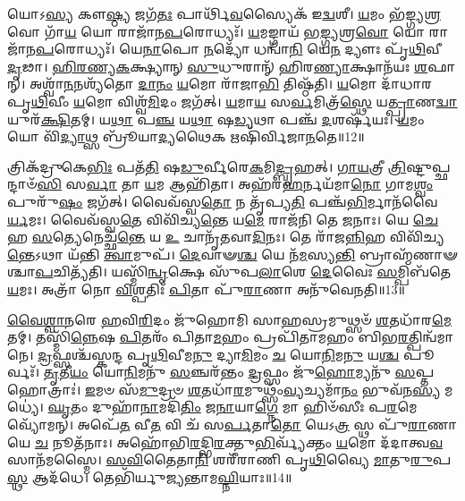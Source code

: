 𑌯𑍋𑌽\-\ul{𑌸𑍍𑌯} 𑌕𑍗\-\ul{𑌷𑍍𑌠𑍍𑌯} 𑌜𑌗᳴\-\ul{𑌤𑌃} 𑌪𑌾𑌰𑍍𑌥𑌿᳴\-\ul{𑌵}\-𑌸𑍍𑌯𑍈𑌕᳴ 𑌇\-\ul{𑌦𑍍𑌵}\-𑌶𑍀। 
\-\ul{𑌯}\-𑌮𑌂 𑌭᳴𑌙𑍍𑌗𑍍𑌯\-\ul{𑌶𑍍𑌰}\-𑌵𑍋 𑌗𑌾᳴\-\ul{𑌯} 𑌯𑍋 𑌰𑌾𑌜𑌾᳴𑌨\-\ul{𑌪}\-𑌰𑍋𑌧𑍍𑌯𑌃᳴। 
\-\ul{𑌯}\-𑌮𑌙𑍍𑌗𑌾𑌯᳴ 𑌭\-\ul{𑌙𑍍𑌗𑍍𑌯}\-𑌶𑍍𑌰\-\ul{𑌵𑍋} 𑌯𑍋 𑌰𑌾𑌜𑌾᳴𑌨\-\ul{𑌪}\-𑌰𑍋𑌧𑍍𑌯𑌃᳴। 
𑌯𑍇\-\ul{𑌨𑌾}\-𑌪𑍋 \ul{𑌨}\-𑌦𑍍𑌯𑍋᳴ 𑌧𑌨𑍍𑌵𑌾᳴\-\ul{𑌨𑌿} 𑌯𑍇\-\ul{𑌨} 𑌦𑍍𑌯𑍗𑌃 𑌪𑍃᳴\-\ul{𑌥𑌿}\-𑌵𑍀 \ul{𑌦𑍃}\-𑌢𑌾। 
\-\ul{𑌹𑌿}\-\-\ul{𑌰}\-\-\ul{𑌣𑍍𑌯}\-\-\ul{𑌕}\-𑌕𑍍𑌷𑍍𑌯𑌾𑌨𑍍 \ul{𑌸𑍁}\-𑌧𑍁𑌰𑌾𑌨𑍍᳴ 𑌹𑌿𑌰\-\ul{𑌣𑍍𑌯𑌾}\-𑌕𑍍𑌷𑌾𑌨᳴𑌯𑌃  \ul{𑌶}\-𑌫𑌾𑌨𑍍। 
𑌅𑌶𑍍𑌵𑌾᳴\-\ul{𑌨}\-𑌨𑌶𑍍𑌯᳴𑌤𑍋 \ul{𑌦𑌾}\-\-\ul{𑌨𑌂} \ul{𑌯}\-𑌮𑍋 𑌰𑌾᳴𑌜𑌾\-\ul{𑌭𑌿} 𑌤𑌿𑌷𑍍𑌠᳴𑌤𑌿। 
\-\ul{𑌯}\-𑌮𑍋 𑌦𑌾᳴𑌧𑌾𑌰 𑌪𑍃\-\ul{𑌥𑌿}\-𑌵𑍀𑌂 \ul{𑌯}\-𑌮𑍋 𑌵𑌿𑌶𑍍𑌵᳴\-\ul{𑌮𑌿}\-𑌦𑌂 𑌜𑌗᳴𑌤𑍍। 
\-\ul{𑌯}\-𑌮𑌾\-\ul{𑌯} 𑌸\-\ul{𑌰𑍍𑌵}\-𑌮𑌿𑌤𑍍𑌰᳴\-\ul{𑌸𑍍𑌥𑍇} 𑌯\-\ul{𑌤𑍍𑌪𑍍𑌰𑌾}\-𑌣\-\ul{𑌦𑍍𑌵𑌾}\-𑌯𑍁𑌰᳴\-\ul{𑌕𑍍𑌷𑌿}\-𑌤𑌮𑍍। 
𑌯\-\ul{𑌥𑌾} 𑌪\-\ul{𑌞𑍍𑌚} 𑌯\-\ul{𑌥𑌾} 𑌷\-\ul{𑌡𑍍𑌯}\-𑌥𑌾 𑌪𑌞𑍍𑌚᳴ \ul{𑌦}\-𑌶𑌰𑍍\mbox{}𑌷᳴𑌯𑌃। 
\-\ul{𑌯}\-𑌮𑌂 𑌯𑍋 𑌵𑌿᳴\-\ul{𑌦𑍍𑌯𑌾}\-𑌥𑍍𑌸 𑌬𑍍𑌰𑍂᳴𑌯𑌾\-\ul{𑌦𑍍𑌯}\-𑌥𑍈𑌕 𑌋𑌷𑌿᳴𑌰𑍍𑌵𑌿𑌜𑌾\-\ul{𑌨}\-𑌤𑍇॥12॥

𑌤𑍍𑌰𑌿𑌕᳴𑌦𑍍𑌰𑍁𑌕𑍇\-\ul{𑌭𑌿𑌃} 𑌪𑌤᳴\-\ul{𑌤𑌿} 𑌷\-\ul{𑌡𑍁}\-𑌰𑍍𑌵𑍀𑌰𑍇\-\ul{𑌕}\-𑌮𑌿\-\ul{𑌦𑍍𑌬𑍃}\-𑌹𑌤𑍍। 
\-\ul{𑌗𑌾}\-\-\ul{𑌯}\-𑌤𑍍𑌰𑍀 \ul{𑌤𑍍𑌰𑌿}\-𑌷𑍍𑌟𑍁𑌪𑍍𑌛𑌨𑍍𑌦𑌾𑍞᳴\-\ul{𑌸𑌿} 𑌸\-\ul{𑌰𑍍𑌵𑌾} 𑌤𑌾 \ul{𑌯}\-𑌮 𑌆𑌹𑌿᳴𑌤𑌾। 
𑌅𑌹᳴𑌰\-\ul{𑌹}\-𑌰𑍍𑌨𑌯᳴𑌮𑌾\-\ul{𑌨𑍋} 𑌗𑌾𑌮\-\ul{𑌶𑍍𑌵𑌂} 𑌪𑍁𑌰𑍁᳴\-\ul{𑌷𑌂} 𑌜𑌗᳴𑌤𑍍। 
𑌵𑍈𑌵᳴𑌸𑍍𑌵\-\ul{𑌤𑍋} 𑌨 𑌤𑍃᳴𑌪𑍍𑌯\-\ul{𑌤𑌿} 𑌪𑌞𑍍𑌚᳴\-\ul{𑌭𑌿}\-𑌰𑍍𑌮𑌾𑌨᳴𑌵𑍈\-\ul{𑌰𑍍𑌯}\-𑌮𑌃। 
𑌵𑍈𑌵᳴𑌸𑍍𑌵\-\ul{𑌤𑍇} 𑌵𑌿𑌵𑌿᳴𑌚𑍍𑌯\-\ul{𑌨𑍍𑌤𑍇} 𑌯\-\ul{𑌮𑍇} 𑌰𑌾𑌜᳴𑌨𑌿 𑌤𑍇 \ul{𑌜}\-𑌨𑌾𑌃। 
𑌯𑍇 \ul{𑌚𑍇}\-𑌹 \ul{𑌸}\-𑌤𑍍𑌯𑍇𑌨𑍇𑌚𑍍𑌛᳴\-\ul{𑌨𑍍𑌤𑍇} 𑌯 \ul{𑌉} 𑌚𑌾𑌨𑍃᳴𑌤𑌵𑌾\-\ul{𑌦𑌿}\-𑌨𑌃। 
𑌤𑍇 𑌰𑌾᳴𑌜\-\ul{𑌨𑍍𑌨𑌿}\-𑌹 𑌵𑌿𑌵𑌿᳴𑌚𑍍𑌯\-\ul{𑌨𑍍𑌤𑍇}\-𑌽𑌥𑌾 𑌯᳴𑌨𑍍𑌤𑌿 \ul{𑌤𑍍𑌵𑌾}\-𑌮𑍁𑌪᳴। 
\-\ul{𑌦𑍇}\-𑌵𑌾𑍟\-\ul{𑌶𑍍𑌚} 𑌯𑍇 𑌨᳴\-\ul{𑌮}\-𑌸𑍍𑌯\-\ul{𑌨𑍍𑌤𑌿} 𑌬𑍍𑌰𑌾𑌹𑍍𑌮᳴𑌣𑌾𑍟𑌶𑍍𑌚𑌾\-\ul{𑌪}\-𑌚𑌿𑌤𑍍𑌯᳴𑌤𑌿। 
𑌯𑌸𑍍𑌮𑌿᳴\-\ul{𑌨𑍍𑌵𑍃}\-𑌕𑍍𑌷𑍇 𑌸𑍁᳴𑌪\-\ul{𑌲𑌾}\-𑌶𑍇 \ul{𑌦𑍇}\-𑌵𑍈𑌃 \ul{𑌸}\-𑌮𑍍𑌪𑌿𑌬᳴𑌤𑍇 \ul{𑌯}\-𑌮𑌃। 
𑌅𑌤𑍍𑌰𑌾᳴ 𑌨𑍋 \ul{𑌵𑌿}\-𑌶𑍍𑌪𑌤𑌿𑌃᳴ \ul{𑌪𑌿}\-𑌤𑌾 𑌪𑍁᳴\-\ul{𑌰𑌾}\-𑌣𑌾 𑌅𑌨𑍁᳴𑌵𑍇𑌨𑌤𑌿॥13॥
\anuvakamend[\-\ul{𑌪}\-\-\ul{𑌥𑌿}\-𑌕𑍃𑌦𑍍𑌭𑍍𑌯𑍋᳴ 𑌵𑌿𑌜𑌾\-\ul{𑌨}\-𑌤𑍇𑌽𑌨𑍁᳴ 𑌵𑍇𑌨𑌤𑌿]

\-\ul{𑌵𑍈}\-\-\ul{𑌶𑍍𑌵𑌾}\-\-\ul{𑌨}\-𑌰𑍇 \ul{𑌹}\-𑌵𑌿\-\ul{𑌰𑌿}\-𑌦𑌂 𑌜𑍁᳴𑌹𑍋𑌮𑌿 𑌸𑌾\-\ul{𑌹}\-𑌸𑍍𑌰𑌮𑍁𑌥𑍍𑌸𑍞᳴ \ul{𑌶}\-𑌤𑌧𑌾᳴𑌰\-\ul{𑌮𑍇}\-𑌤𑌮𑍍। 
𑌤𑌸𑍍𑌮𑌿᳴\-\ul{𑌨𑍍𑌨𑍇}\-𑌷 \ul{𑌪𑌿}\-𑌤𑌰𑌂᳴ 𑌪𑌿𑌤𑌾\-\ul{𑌮}\-𑌹𑌂 𑌪𑍍𑌰𑌪𑌿᳴𑌤𑌾𑌮𑌹𑌂 𑌬𑌿𑌭\-\ul{𑌰}\-𑌤𑍍𑌪𑌿𑌨𑍍𑌵᳴𑌮𑌾𑌨𑍇। 
\-\ul{𑌦𑍍𑌰}\-𑌫𑍍𑌸𑌶𑍍𑌚᳴𑌸𑍍𑌕𑌨𑍍𑌦 𑌪𑍃\-\ul{𑌥𑌿}\-𑌵𑍀𑌮\-\ul{𑌨𑍁} 𑌦𑍍𑌯𑌾\-\ul{𑌮𑌿}\-𑌮𑌂 \ul{𑌚} 𑌯𑍋\-\ul{𑌨𑌿}\-𑌮\-\ul{𑌨𑍁} 𑌯\-\ul{𑌶𑍍𑌚} 𑌪𑍂𑌰𑍍𑌵𑌃᳴। 
\-\ul{𑌤𑍃}\-𑌤𑍀\-\ul{𑌯𑌂} 𑌯𑍋\-\ul{𑌨𑌿}\-𑌮𑌨𑍁᳴ \ul{𑌸}\-𑌞𑍍𑌚𑌰᳴𑌨𑍍𑌤𑌂 \ul{𑌦𑍍𑌰}\-𑌫𑍍𑌸𑌂 𑌜𑍁᳴\-\ul{𑌹𑍋}\-𑌮𑍍𑌯𑌨𑍁᳴ \ul{𑌸}\-𑌪𑍍𑌤 𑌹𑍋𑌤𑍍𑌰𑌾𑌃॑। 
\-\ul{𑌇}\-𑌮𑍞 𑌸᳴\-\ul{𑌮𑍁}\-𑌦𑍍𑌰𑍞 \ul{𑌶}\-𑌤𑌧𑌾᳴\-\ul{𑌰}\-𑌮𑍁𑌥𑍍𑌸𑌂᳴\-\ul{𑌵𑍍𑌯}\-𑌚𑍍𑌯𑌮𑌾᳴\-\ul{𑌨𑌂} 𑌭𑍁𑌵᳴𑌨\-\ul{𑌸𑍍𑌯} 𑌮𑌧𑍍𑌯𑍇॑। 
\-\ul{𑌘𑍃}\-𑌤𑌂 𑌦𑍁𑌹𑌾᳴\-\ul{𑌨𑌾}\-𑌮𑌦𑌿᳴\-\ul{𑌤𑌿𑌂} 𑌜\-\ul{𑌨𑌾}\-𑌯𑌾\-\ul{𑌗𑍍𑌨𑍇} 𑌮𑌾 𑌹𑌿𑍞᳴𑌸𑍀𑌃 𑌪\-\ul{𑌰}\-𑌮𑍇 𑌵𑍍𑌯𑍋᳴𑌮𑌨𑍍। 
𑌅𑌪𑍇᳴\-\ul{𑌤} 𑌵𑍀\-\ul{𑌤} 𑌵𑌿 𑌚᳴ 𑌸\-\ul{𑌰𑍍𑌪}\-𑌤𑌾\-\ul{𑌤𑍋} 𑌯𑍇𑌽\-\ul{𑌤𑍍𑌰} 𑌸𑍍𑌥 𑌪𑍁᳴\-\ul{𑌰𑌾}\-𑌣𑌾 𑌯𑍇 \ul{𑌚} 𑌨𑍂𑌤᳴𑌨𑌾𑌃। 
𑌅𑌹𑍋᳴𑌭𑌿\-\ul{𑌰}\-𑌦𑍍𑌭𑌿\-\ul{𑌰}\-𑌕𑍍𑌤𑍁\-\ul{𑌭𑌿}\-𑌰𑍍𑌵𑍍𑌯᳴𑌕𑍍𑌤𑌂 \ul{𑌯}\-𑌮𑍋 𑌦᳴𑌦𑌾𑌤𑍍𑌵\-\ul{𑌵}\-𑌸𑌾𑌨᳴𑌮𑌸𑍍𑌮𑍈। 
\-\ul{𑌸}\-\-\ul{𑌵𑌿}\-𑌤𑍈𑌤𑌾\-\ul{𑌨𑌿} 𑌶𑌰𑍀᳴𑌰𑌾𑌣𑌿 𑌪𑍃\-\ul{𑌥𑌿}\-𑌵𑍍𑌯𑍈 \ul{𑌮𑌾}\-𑌤𑍁\-\ul{𑌰𑍁}\-𑌪\-\ul{𑌸𑍍𑌥} 𑌆𑌦᳴𑌧𑍇। 
𑌤𑍇𑌭𑌿᳴𑌰𑍍𑌯𑍁𑌜𑍍𑌯𑌨𑍍𑌤𑌾𑌮\-\ul{𑌘𑍍𑌨𑌿}\-𑌯𑌾𑌃॥14॥

